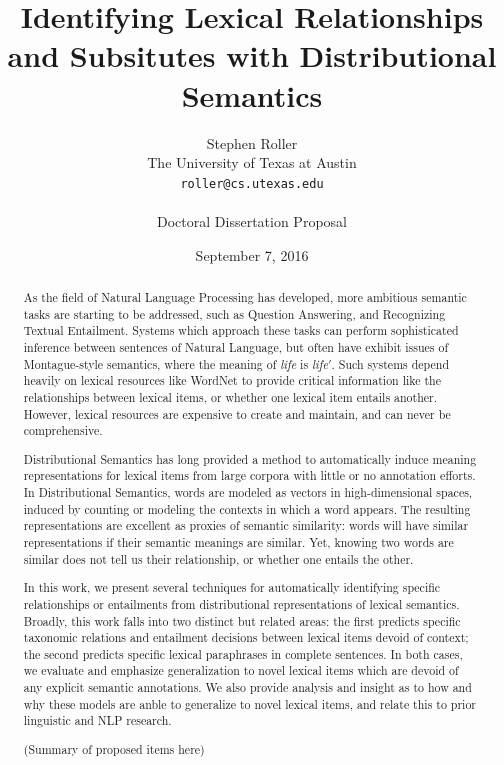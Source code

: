 \documentclass[12pt]{article}
\title{Identifying Lexical Relationships and Subsitutes with Distributional Semantics}
\author{Stephen Roller\\
The University of Texas at Austin\\
{\tt roller@cs.utexas.edu}\\
\\
Doctoral Dissertation Proposal}
\date{September 7, 2016}
\begin{document}
\maketitle

\begin{abstract}
  As the field of Natural Language Processing has developed, more ambitious
  semantic tasks are starting to be addressed, such as Question Answering, and
  Recognizing Textual Entailment. Systems which approach these tasks can
  perform sophisticated inference between sentences of Natural Language, but
  often have exhibit issues of Montague-style semantics, where the meaning of
  {\em life} is {\em life$'$}. Such systems depend heavily on lexical resources
  like WordNet to provide critical information like the relationships between
  lexical items, or whether one lexical item entails another. However, lexical
  resources are expensive to create and maintain, and can never be
  comprehensive.

  Distributional Semantics has long provided a method to automatically induce
  meaning representations for lexical items from large corpora with little or
  no annotation efforts. In Distributional Semantics, words are modeled as
  vectors in high-dimensional spaces, induced by counting or modeling the
  contexts in which a word appears. The resulting representations are excellent
  as proxies of semantic similarity: words will have similar representations if
  their semantic meanings are similar. Yet, knowing two words are similar does
  not tell us their relationship, or whether one entails the other.

  In this work, we present several techniques for automatically identifying
  specific relationships or entailments from distributional representations of
  lexical semantics. Broadly, this work falls into two distinct but related
  areas: the first predicts specific taxonomic relations and entailment
  decisions between lexical items devoid of context;
  the second predicts specific lexical paraphrases in complete sentences. In
  both cases, we evaluate and emphasize generalization to novel lexical items
  which are devoid of any explicit semantic annotations.  We also provide
  analysis and insight as to how and why these models are anble to generalize
  to novel lexical items, and relate this to prior linguistic and NLP research.

  (Summary of proposed items here)
\end{abstract}
\end{document}
